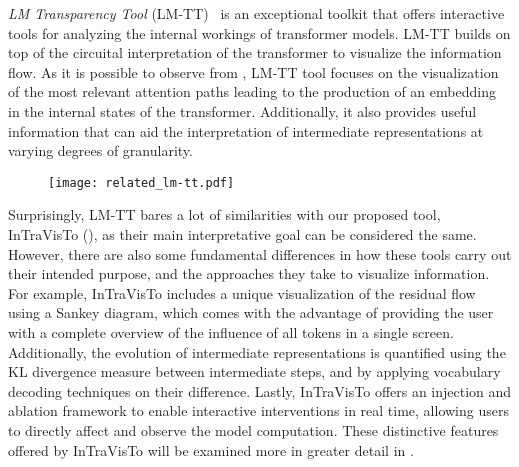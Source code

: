 \textit{LM Transparency Tool} (LM-TT)~\cite{tufanov2024} is an exceptional toolkit that offers interactive tools for analyzing the internal workings of transformer models.
LM-TT builds on top of the circuital interpretation of the transformer to visualize the information flow.
As it is possible to observe from , LM-TT tool focuses on the visualization of the most relevant attention paths leading to the production of an embedding in the internal states of the transformer.
Additionally, it also provides useful information that can aid the interpretation of intermediate representations at varying degrees of granularity.

\begin{figure}[t!]
    \centering
    \texttt{[image: related\_lm-tt.pdf]}
    \caption{}
    \label{fig:related_lm-tt}
\end{figure}

Surprisingly, LM-TT bares a lot of similarities with our proposed tool, InTraVisTo (), as their main interpretative goal can be considered the same.
However, there are also some fundamental differences in how these tools carry out their intended purpose, and the approaches they take to visualize information.
For example, InTraVisTo includes a unique visualization of the residual flow using a Sankey diagram, which comes with the advantage of providing the user with a complete overview of the influence of all tokens in a single screen.
Additionally, the evolution of intermediate representations is quantified using the KL divergence measure between intermediate steps, and by applying vocabulary decoding techniques on their difference.
Lastly, InTraVisTo offers an injection and ablation framework to enable interactive interventions in real time, allowing users to directly affect and observe the model computation.
These distinctive features offered by InTraVisTo will be examined more in greater detail in .